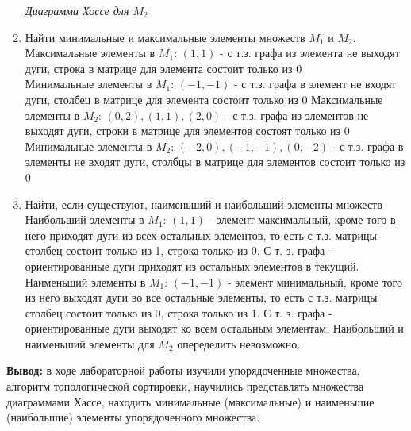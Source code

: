 \documentclass[a4paper,14pt]{extarticle}
\begin{document}
\begin{enumerate}[1.]
\begin{center}
              \textit{Диаграмма Хоссе для $M_2$}
          \end{center}
    \item Найти минимальные и максимальные элементы множеств $M_1$ и $M_2$.\\
          Максимальные элементы в $M_1$: $(1, 1)$ - с т.з. графа из элемента не выходят дуги, строка в матрице для элемента состоит только из 0 \\
          Минимальные элементы в $M_1$: $(-1, -1)$ - с т.з. графа в элемент не входят дуги, столбец в матрице для элемента состоит только из 0 \bigbreak
          Максимальные элементы в $M_2$: $(0, 2), (1, 1), (2, 0)$ - с т.з. графа из элементов не выходят дуги, строки в матрице для элементов состоят только из 0 \\
          Минимальные элементы в $M_2$: $(-2, 0), (-1, -1), (0, -2)$ - с т.з. графа в элементы не входят дуги, столбцы в матрице для элементов состоит только из 0
    \item Найти, если существуют, наименьший и наибольший элементы множеств\\
          Наибольший элементы в $M_1$: $(1, 1)$ - элемент максимальный, кроме того в него приходят дуги из всех остальных элементов, то есть с т.з. матрицы столбец состоит только из 1, строка только из 0. С т. з. графа - ориентированные дуги приходят из остальных элементов в текущий. \\
          Наименьший элементы в $M_1$: $(-1, -1)$ - элемент минимальный, кроме того из него выходят дуги во все остальные элементы, то есть с т.з. матрицы столбец состоит только из 0, строка только из 1. С т. з. графа - ориентированные дуги выходят ко всем остальным элементам. \bigbreak
          Наибольший и наименьший элементы для $M_2$ опеределить невозможно.
\end{enumerate}

\textbf{Вывод: } в ходе лабораторной работы изучили упорядоченные множества, алгоритм
топологической сортировки, научились представлять
множества диаграммами Хассе, находить минимальные
(максимальные) и наименьшие (наибольшие) элементы
упорядоченного множества.
\end{document}
